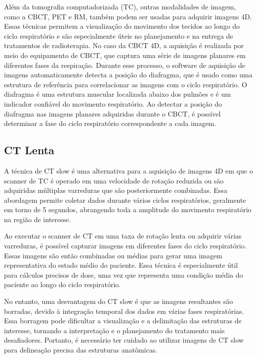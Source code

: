 \documentclass[11pt,a4paper]{article}
\begin{document}
	Além da tomografia computadorizada (TC), outras modalidades de imagem, como a CBCT, PET e RM, também podem ser usadas para adquirir imagens 4D. Essas técnicas permitem a visualização do movimento dos tecidos ao longo do ciclo respiratório e são especialmente úteis no planejamento e na entrega de tratamentos de radioterapia. No caso da CBCT 4D, a aquisição é realizada por meio do equipamento de CBCT, que captura uma série de imagens planares em diferentes fases da respiração. Durante esse processo, o software de aquisição de imagens automaticamente detecta a posição do diafragma, que é usado como uma estrutura de referência para correlacionar as imagens com o ciclo respiratório. O diafragma é uma estrutura muscular localizada abaixo dos pulmões e é um indicador confiável do movimento respiratório. Ao detectar a posição do diafragma nas imagens planares adquiridas durante o CBCT, é possível determinar a fase do ciclo respiratório correspondente a cada imagem.


\subsection*{CT Lenta}

	A técnica de CT slow é uma alternativa para a aquisição de imagens 4D em que o scanner de TC é operado em uma velocidade de rotação reduzida ou são adquiridas múltiplas varreduras que são posteriormente combinadas. Essa abordagem permite coletar dados durante vários ciclos respiratórios, geralmente em torno de 5 segundos, abrangendo toda a amplitude do movimento respiratório na região de interesse. 

	Ao executar o scanner de CT em uma taxa de rotação lenta ou adquirir várias varreduras, é possível capturar imagens em diferentes fases do ciclo respiratório. Essas imagens são então combinadas ou médias para gerar uma imagem representativa do estado médio do paciente. Essa técnica é especialmente útil para cálculos precisos de dose, uma vez que representa uma condição média do paciente ao longo do ciclo respiratório.

	No entanto, uma desvantagem do CT slow é que as imagens resultantes são borradas, devido à integração temporal dos dados em várias fases respiratórias. Essa borragem pode dificultar a visualização e a delimitação das estruturas de interesse, tornando a interpretação e o planejamento do tratamento mais desafiadores. Portanto, é necessário ter cuidado ao utilizar imagens de CT slow para delineação precisa das estruturas anatômicas.
\end{document}
